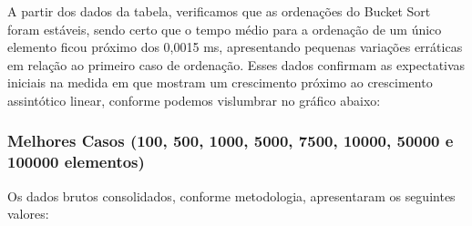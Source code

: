 \documentclass[a4paper, 12pt]{article}
\begin{document}
A partir dos dados da tabela, verificamos que as ordenações do Bucket Sort foram estáveis, sendo certo que o tempo médio para a ordenação de um único elemento ficou próximo dos 0,0015 ms, apresentando pequenas variações erráticas em relação ao primeiro caso de ordenação. Esses dados confirmam as expectativas iniciais na medida em que mostram um crescimento próximo ao crescimento assintótico linear, conforme podemos vislumbrar no gráfico abaixo:

\vspace{0.3cm}
\begin{center}
\end{center}
\subsubsection{Melhores Casos (100, 500, 1000, 5000, 7500, 10000, 50000 e 100000 elementos)}
\tab{ }Os dados brutos consolidados, conforme metodologia, apresentaram os seguintes valores:
\vspace{0.3cm}
\end{document}
